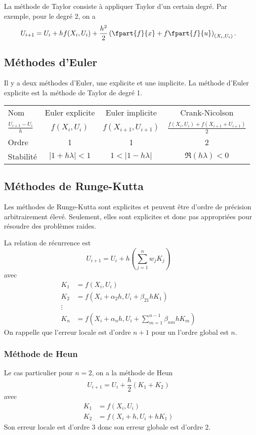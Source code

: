 La méthode de Taylor consiste à appliquer Taylor d'un certain degré.
Par exemple, pour le degré 2, on a
\[ U_{i+1} = U_i + h f(X_i, U_i) +
\frac{h^2}{2}\left(\fpart{f}{x}+f\fpart{f}{u}\right)_{(X_i,U_i)}. \]

\subsection{Méthodes d'Euler}
Il y a deux méthodes d'Euler, une explicite et une implicite.
La méthode d'Euler explicite est la méthode de Taylor de degré 1.
\begin{center}
  \begin{tabular}{|l|ccc|}
    \hline
    Nom & Euler explicite & Euler implicite & Crank-Nicolson\\
    $\frac{U_{i+1}-U_i}{h}$ & $f(X_i,U_i)$ & $f(X_{i+1},U_{i+1})$
    & $\frac{f(X_i,U_i)+f(X_{i+1}+U_{i+1})}{2}$\\
    Ordre & 1 & 1 & 2\\
    Stabilité & $|1 + h\lambda| < 1$ & $1 < |1 - h\lambda|$
    & $\Re(h\lambda) < 0$\\
    \hline
  \end{tabular}
\end{center}

\subsection{Méthodes de Runge-Kutta}
Les méthodes de Runge-Kutta sont explicites et peuvent être d'ordre de
précision arbitrairement élevé.
Seulement, elles sont explicites et donc pas appropriées pour
résoudre des problèmes raides.

La relation de récurrence est
\[ U_{i+1} = U_i + h\left(\sum_{j=1}^n w_jK_j\right) \]
avec
\begin{align*}
  K_1 & = f(X_i, U_i)\\
  K_2 & = f(X_i + \alpha_2 h, U_i + \beta_{21}hK_1)\\
  \vdots\\
  K_n & = f\left(X_i + \alpha_n h, U_i + \sum_{m=1}^{n-1}\beta_{nm}hK_m\right)
\end{align*}
On rappelle que l'erreur locale est d'ordre $n+1$
pour un l'ordre global est $n$.

\subsubsection{Méthode de Heun}
Le cas particulier pour $n = 2$,
on a la méthode de Heun
\[ U_{i+1} = U_i + \frac{h}{2}(K_1 + K_2) \]
avec
\begin{align*}
  K_1 & = f(X_i, U_i)\\
  K_2 & = f(X_i + h, U_i + hK_1)
\end{align*}
Son erreur locale est d'ordre 3 donc son erreur globale est d'ordre 2.

